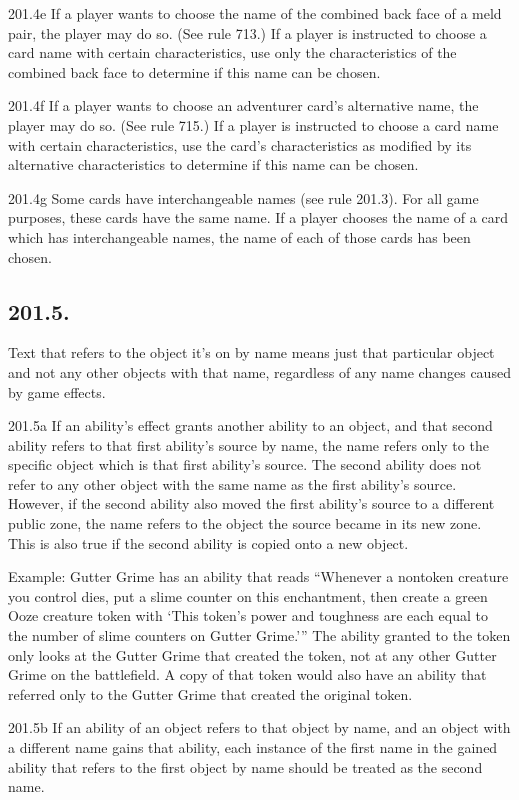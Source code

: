 201.4e If a player wants to choose the name of the combined back face of a meld pair, the player may do so. (See rule 713.) If a player is instructed to choose a card name with certain characteristics, use only the characteristics of the combined back face to determine if this name can be chosen.

201.4f If a player wants to choose an adventurer card’s alternative name, the player may do so. (See rule 715.) If a player is instructed to choose a card name with certain characteristics, use the card’s characteristics as modified by its alternative characteristics to determine if this name can be chosen.

201.4g Some cards have interchangeable names (see rule 201.3). For all game purposes, these cards have the same name. If a player chooses the name of a card which has interchangeable names, the name of each of those cards has been chosen.

\subsection*{201.5.}
Text that refers to the object it’s on by name means just that particular object and not any other objects with that name, regardless of any name changes caused by game effects.

201.5a If an ability’s effect grants another ability to an object, and that second ability refers to that first ability’s source by name, the name refers only to the specific object which is that first ability’s source. The second ability does not refer to any other object with the same name as the first ability’s source. However, if the second ability also moved the first ability’s source to a different public zone, the name refers to the object the source became in its new zone. This is also true if the second ability is copied onto a new object.

Example: Gutter Grime has an ability that reads “Whenever a nontoken creature you control dies, put a slime counter on this enchantment, then create a green Ooze creature token with ‘This token’s power and toughness are each equal to the number of slime counters on Gutter Grime.’” The ability granted to the token only looks at the Gutter Grime that created the token, not at any other Gutter Grime on the battlefield. A copy of that token would also have an ability that referred only to the Gutter Grime that created the original token.

201.5b If an ability of an object refers to that object by name, and an object with a different name gains that ability, each instance of the first name in the gained ability that refers to the first object by name should be treated as the second name.

